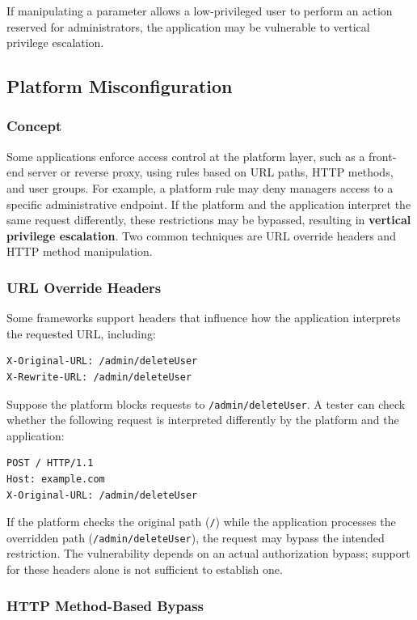 \documentclass[11pt,a4paper]{article}
\begin{document}
If manipulating a parameter allows a low-privileged user to perform an action reserved for administrators, the application may be vulnerable to vertical privilege escalation.

\subsection{Platform Misconfiguration}

\subsubsection{Concept}

Some applications enforce access control at the platform layer, such as a front-end server or reverse proxy, using rules based on URL paths, HTTP methods, and user groups.
For example, a platform rule may deny managers access to a specific administrative endpoint. If the platform and the application interpret the same request differently, these restrictions may be bypassed, resulting in \textbf{vertical privilege escalation}.
Two common techniques are URL override headers and HTTP method manipulation.

\subsubsection{URL Override Headers}

Some frameworks support headers that influence how the application interprets the requested URL, including:
\begin{lstlisting}[language=HTTP]
X-Original-URL: /admin/deleteUser
X-Rewrite-URL: /admin/deleteUser
\end{lstlisting}

Suppose the platform blocks requests to \texttt{/admin/deleteUser}. A tester can check whether the following request is interpreted differently by the platform and the application:
\begin{lstlisting}[language=HTTP]
POST / HTTP/1.1
Host: example.com
X-Original-URL: /admin/deleteUser
\end{lstlisting}

If the platform checks the original path (\texttt{/}) while the application processes the overridden path (\texttt{/admin/deleteUser}), the request may bypass the intended restriction.
The vulnerability depends on an actual authorization bypass; support for these headers alone is not sufficient to establish one.

\subsubsection{HTTP Method-Based Bypass}
\end{document}
